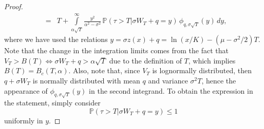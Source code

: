 \documentclass[12pt]{article}
\theoremstyle{definition}
\begin{document}
\begin{proof}
\begin{eqnarray}
&=&
T + \int\limits_{\alpha\sqrt{T}}^\infty\frac{y^2}{\alpha^2 - \sigma^2} \, \mathbb{P}(\tau>T\vert \sigma W_T+q=y) \, \phi_{q,\sigma \sqrt{T}}(y) \, dy,
\end{eqnarray}
where we have used the relations $y=\sigma z(x)+q=\ln(x/K)-(\mu-\sigma^2/2)T$. Note that the change in the integration limits comes from the fact that $V_T>B(T)\Leftrightarrow \sigma W_T+q>\alpha\sqrt{T}$ due to the definition of $T$, which implies $B(T)=B_c(T,\alpha)$. Also, note that, since $V_T$ is lognormally distributed, then $q+\sigma W_T$ is normally distributed with mean $q$ and variance $\sigma^2T$, hence the appearance of $\phi_{q,\sigma\sqrt{T}}(y)$ in the second integrand. To obtain the expression in the statement, simply consider
$$
\mathbb{P}(\tau>T\vert \sigma W_T+q=y)\leq 1
$$
uniformly in $y$.


\end{proof}
\end{document}

